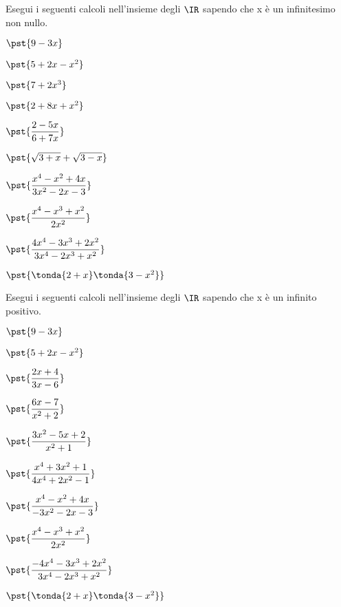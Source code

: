 \begin{esercizio}\label{ese:iper_op_01}
Esegui i seguenti calcoli nell'insieme degli \(\IR\) sapendo che 
x è un infinitesimo non nullo.
\begin{multicols}{2}
\begin{enumeratea}
 \item \(\pst{9 -3x}\)
 \item \(\pst{5 +2x -x^2}\)
 \item \(\pst{7 +2x^3}\) 
 \item \(\pst{2+8x+x^2}\) 
 \item \(\pst{\dfrac{2-5x}{6 +7x}}\)
 \item \(\pst{\sqrt{3 +x} + \sqrt{3 -x}}\) 
 \item \(\pst{\dfrac{x^4 - x^2 + 4x}{3x^2 -2x -3}}\) 
 \item \(\pst{\dfrac{x^4 - x^3 + x^2}{2x^2}}\) 
 \item \(\pst{\dfrac{4x^4 - 3x^3 + 2x^2}{3x^4 -2x^3 +x^2}} \) 
 \item \(\pst{\tonda{2+x}\tonda{3-x^2}} \)  
\end{enumeratea}
\end{multicols}
\end{esercizio}

\begin{esercizio}\label{ese:iper_op_01}
Esegui i seguenti calcoli nell'insieme degli \(\IR\) sapendo che 
x è un infinito positivo.
\begin{multicols}{2}
\begin{enumeratea}
 \item \(\pst{9 -3x}\)
 \item \(\pst{5 +2x -x^2}\)
 \item \(\pst{\dfrac{2x +4}{3x-6}}\)
 \item \(\pst{\dfrac{6 x-7}{x^2 +2}}\)
 \item \(\pst{\dfrac{3x^2 -5x +2}{x^2 +1}}\)
 \item \(\pst{\dfrac{x^4 +3x^2 +1}{4x^4 +2x^2 -1}}\)
 \item \(\pst{\dfrac{x^4 - x^2 + 4x}{-3x^2 -2x -3}}\) 
 \item \(\pst{\dfrac{x^4 - x^3 + x^2}{2x^2}}\) 
 \item \(\pst{\dfrac{-4x^4 - 3x^3 + 2x^2}{3x^4 -2x^3 +x^2}} \) 
 \item \(\pst{\tonda{2+x}\tonda{3-x^2}} \)  
\end{enumeratea}
\end{multicols}
\end{esercizio}

